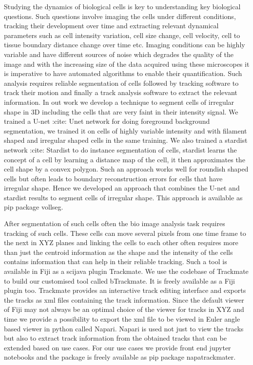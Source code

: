 \documentclass[letterpaper,compsoc,twoside]{IEEEtran}
\begin{document}
Studying the dynamics of biological cells is key to understanding key biological questions. Such questions involve imaging the cells under different conditions, tracking their development over time and extracting relevant dynamical parameters such as cell intensity variation, cell size change, cell velocity, cell to tissue boundary distance change over time etc. Imaging conditions can be highly variable and have different sources of noise which degrades the quality of the image and with the increasing size of the data acquired using these microscopes it is imperative to have automated algorithms to enable their quantification. Such analysis requires reliable segmentation of cells followed by tracking software to track their motion and finally a track analysis software to extract the relevant information. In out work we develop a technique to segment cells of irregular shape in 3D including the cells that are very faint in their intensity signal. We trained a U-net :cite: Unet network for doing foreground background segmentation, we trained it on cells of highly variable intensity and with filament shaped and irregular shaped cells in the same training. We also trained a stardist network :cite: Stardist to do instance segmentation of cells, stardist learns the concept of a cell by learning a distance map of the cell, it then approximates the cell shape by a convex polygon. Such an approach works well for roundish shaped cells but often leads to boundary reconstruction errors for cells that have irregular shape. Hence we developed an approach that combines the U-net and stardist results to segment cells of irregular shape. This approach is available as pip package vollseg.

After segmentation of such cells often the bio image analysis task requires tracking of such cells. These cells can move several pixels from one time frame to the next in XYZ planes and linking the cells to each other often requires more than just the centroid information as the shape and the intensity of the cells contains information that can help in their reliable tracking. Such a tool is available in Fiji as a scijava plugin Trackmate. We use the codebase of Trackmate to build our customised tool called bTrackmate. It is freely available as a Fiji plugin too. Trackmate provides an interactive track editing interface and exports the tracks as xml files containing the track information. Since the default viewer of Fiji may not always be an optimal choice of the viewer for tracks in XYZ and time we provide a possibility to export the xml file to be viewed in Euler angle based viewer in python called Napari. Napari is used not just to view the tracks but also to extract track information from the obtained tracks that can be extended based on use cases. For our use cases we provide front end jupyter notebooks and the package is freely available as pip package napatrackmater.
\end{document}

